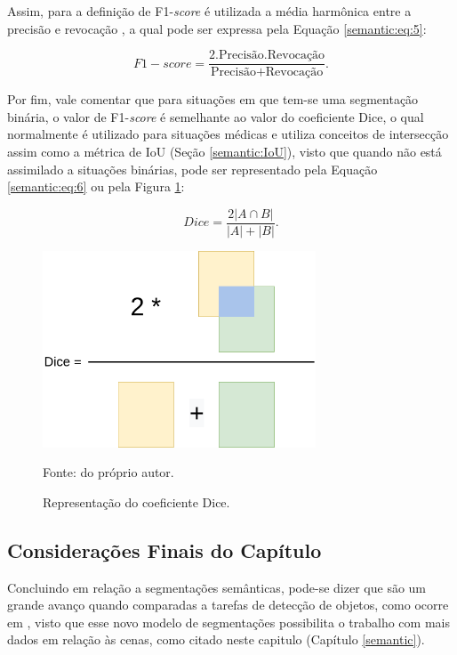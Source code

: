 Assim, para a definição de F1-\textit{score} é utilizada a média harmônica entre a precisão e revocação \cite{Minaee2021}, a qual pode ser expressa pela Equação \ref{semantic:eq:5}:

\begin{equation}
    \label{semantic:eq:5}
    F1-score = \frac{2 . \text{Precisão} . \text{Revocação}}{\text{Precisão} + \text{Revocação}}.
\end{equation}

Por fim, vale comentar que para situações em que tem-se uma segmentação binária, o valor de F1-\textit{score} é semelhante ao valor do coeficiente Dice, o qual normalmente é utilizado para situações médicas \cite{Minaee2021} e utiliza conceitos de intersecção assim como a métrica de IoU (Seção \ref{semantic:IoU}), visto que quando não está assimilado a situações binárias, pode ser representado pela Equação \ref{semantic:eq:6} ou pela Figura \ref{semantic:fig:2}:

\begin{equation}
    \label{semantic:eq:6}
    Dice = \frac{2|A \cap B|}{|A| + |B|}.
\end{equation}

\begin{figure}[H]
    \centering
    \caption{Representação do coeficiente Dice.}
    \includegraphics[height=2.3in]{recursos/imagens/semantic/dice.png}
    \label{semantic:fig:2}

    Fonte: do próprio autor.
\end{figure}

\subsection{Considerações Finais do Capítulo}
\label{semantic:conclusion}
Concluindo em relação a segmentações semânticas, pode-se dizer que são um grande avanço quando comparadas a tarefas de detecção de objetos, como ocorre em \cite{Vaillant1994}, visto que esse novo modelo de segmentações possibilita o trabalho com mais dados em relação às cenas, como citado neste capitulo (Capítulo \ref{semantic}).

